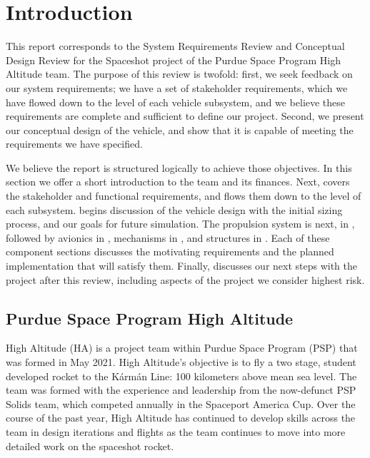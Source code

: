 \section{Introduction} \label{section:introduction}
This report corresponds to the System Requirements Review and Conceptual Design Review for the Spaceshot project of the Purdue Space Program High Altitude team. The purpose of this review is twofold: first, we seek feedback on our system requirements; we have a set of stakeholder requirements, which we have flowed down to the level of each vehicle subsystem,  and we believe these requirements are complete and sufficient to define our project. Second, we present our conceptual design of the vehicle, and show that it is capable of meeting the requirements we have specified.

We believe the report is structured logically to achieve those objectives. In this section we offer a short introduction to the team and its finances. Next,  covers the stakeholder and functional requirements, and flows them down to the level of each subsystem.  begins discussion of the vehicle design with the initial sizing process, and our goals for future simulation. The propulsion system is next, in , followed by avionics in , mechanisms in , and structures in . Each of these component sections discusses the motivating requirements and the planned implementation that will satisfy them. Finally,  discusses our next steps with the project after this review, including aspects of the project we consider highest risk.

\subsection{Purdue Space Program High Altitude}
High Altitude (HA) is a project team within Purdue Space Program (PSP) that was formed in May 2021. High Altitude’s objective is to fly a two stage, student developed rocket to the K\'{a}rm\'{a}n Line: 100 kilometers above mean sea level. The team was formed with the experience and leadership from the now-defunct PSP Solids team, which competed annually in the Spaceport America Cup. Over the course of the past year, High Altitude has continued to develop skills across the team in design iterations and flights as the team continues to move into more detailed work on the spaceshot rocket.

